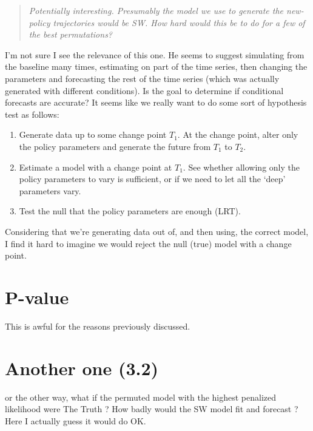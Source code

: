 \documentclass[]{article}
\providecommand{\tightlist}{%
  \setlength{\itemsep}{0pt}\setlength{\parskip}{0pt}}
\begin{document}
\begin{quotation} {\em Potentially interesting.  Presumably the model we use to
    generate the new-policy trajectories would be SW.  How hard would this be
    to do for a few of the best permutations?}
\end{quotation}

I'm not sure I see the relevance of this one. He seems to suggest
simulating from the baseline many times, estimating on part of the time
series, then changing the parameters and forecasting the rest of the
time series (which was actually generated with different conditions). Is
the goal to determine if conditional forecasts are accurate? It seems
like we really want to do some sort of hypothesis test as follows:

\begin{enumerate}
\def\labelenumi{\arabic{enumi}.}
\tightlist
\item
  Generate data up to some change point \(T_1\). At the change point,
  alter only the policy parameters and generate the future from \(T_1\)
  to \(T_2\).
\item
  Estimate a model with a change point at \(T_1\). See whether allowing
  only the policy parameters to vary is sufficient, or if we need to let
  all the `deep' parameters vary.
\item
  Test the null that the policy parameters are enough (LRT).
\end{enumerate}

Considering that we're generating data out of, and then using, the
correct model, I find it hard to imagine we would reject the null (true)
model with a change point.

\hypertarget{p-value}{%
\section{P-value}\label{p-value}}

This is awful for the reasons previously discussed.

\hypertarget{another-one-3.2}{%
\section{Another one (3.2)}\label{another-one-3.2}}

or the other way, what if the permuted model with the highest penalized
likelihood were The Truth ? How badly would the SW model fit and
forecast ? Here I actually guess it would do OK.
\end{document}
